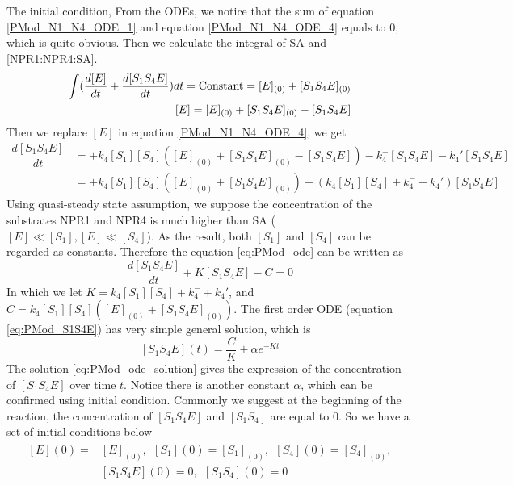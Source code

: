 The initial condition, 
From the ODEs, we notice that the sum of equation \ref{PMod_N1_N4_ODE_1} and equation \ref{PMod_N1_N4_ODE_4} equals to 0, which is quite obvious. Then we calculate the integral of SA and [NPR1:NPR4:SA].
\begin{align*}
\int (\dfrac{d[E]}{dt} + \dfrac{d[S_1 S_4 E]}{dt}) dt = \textrm{Constant} = [E]_{(0)} + [S_1 S_4 E]_{(0)}\\
\centering
[E] = [E]_{(0)} + [S_1 S_4 E]_{(0)} - [S_1 S_4 E]
\end{align*}
Then we replace $[E]$ in equation \ref{PMod_N1_N4_ODE_4}, we get
\begin{align}
\dfrac{d[S_1 S_4 E]}{dt} &= + k_4[S_1][S_4]([E]_{(0)} + [S_1 S_4 E]_{(0)} - [S_1 S_4 E]) - k_4^{-} [S_1 S_4 E] - k_4'[S_1 S_4 E]\\
&= +k_4[S_1][S_4]([E]_{(0)}+[S_1 S_4 E]_{(0)}) - (k_4[S_1][S_4] + k_4^{-} - k_4')[S_1 S_4 E] \label{eq:PMod_ode}
\end{align}
Using quasi-steady state assumption, we suppose the concentration of the substrates NPR1 and NPR4 is much higher than SA ($[E]\ll[S_1], [E]\ll[S_4]$). As the result, both $[S_1]$ and $[S_4]$ can be regarded as constants. Therefore the equation \ref{eq:PMod_ode} can be written as\\
\begin{equation} \label{eq:PMod_S1S4E}
\frac{d[S_1 S_4 E]}{dt} + K[S_1 S_4 E] - C = 0
\end{equation}
In which we let $K = k_4[S_1][S_4] + k_4^{-} + k_4'$, and $C = k_4[S_1][S_4]([E]_{(0)}+[S_1 S_4 E]_{(0)})$. The first order ODE (equation \ref{eq:PMod_S1S4E}) has very simple general solution, which is
\begin{equation} \label{eq:PMod_ode_solution}
[S_1 S_4 E](t) = \dfrac{C}{K} + \alpha e^{-Kt}
\end{equation}
The solution \ref{eq:PMod_ode_solution} gives the expression of the concentration of $[S_1 S_4 E]$ over time $t$. Notice there is another constant $\alpha$, which can be confirmed using initial condition. Commonly we suggest at the beginning of the reaction, the concentration of $[S_1 S_4 E]$ and $[S_1 S_4]$ are equal to 0. So we have a set of initial conditions below
\begin{align} \label{eq:PMod_ode_initial_conditions}
\begin{split}
[E](0) = & [E]_{(0)},~~[S_1](0) = [S_1]_{(0)},~~[S_4](0) = [S_4]_{(0)}, \\
& [S_1 S_4 E](0) = 0,~~[S_1 S_4](0) = 0
\end{split}
\end{align}
